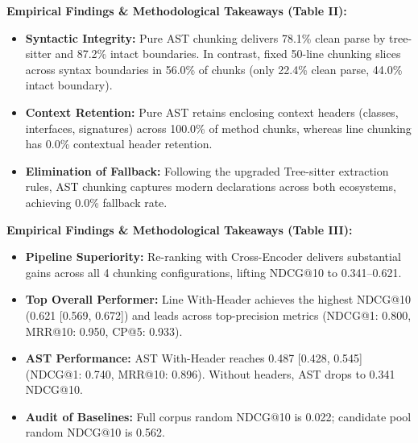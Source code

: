 \documentclass[11pt,a4paper,landscape]{article}
\begin{document}

\FloatBarrier
\vspace{-0.1cm}
{\small
\noindent\textbf{Empirical Findings \& Methodological Takeaways (Table II):}
\begin{itemize}[nosep,topsep=2pt,partopsep=0pt,itemsep=2pt]
    \item \textbf{Syntactic Integrity:} Pure AST chunking delivers 78.1\% clean parse by tree-sitter and 87.2\% intact boundaries. In contrast, fixed 50-line chunking slices across syntax boundaries in 56.0\% of chunks (only 22.4\% clean parse, 44.0\% intact boundary).
    \item \textbf{Context Retention:} Pure AST retains enclosing context headers (classes, interfaces, signatures) across 100.0\% of method chunks, whereas line chunking has 0.0\% contextual header retention.
    \item \textbf{Elimination of Fallback:} Following the upgraded Tree-sitter extraction rules, AST chunking captures modern declarations across both ecosystems, achieving 0.0\% fallback rate.
\end{itemize}
}
\clearpage


\FloatBarrier
\vspace{-0.1cm}
{\footnotesize
\noindent\textbf{Empirical Findings \& Methodological Takeaways (Table III):}
\begin{itemize}[nosep,topsep=2pt,partopsep=0pt,itemsep=2pt]
    \item \textbf{Pipeline Superiority:} Re-ranking with Cross-Encoder delivers substantial gains across all 4 chunking configurations, lifting NDCG@10 to 0.341--0.621.
    \item \textbf{Top Overall Performer:} Line With-Header achieves the highest NDCG@10 (0.621 [0.569, 0.672]) and leads across top-precision metrics (NDCG@1: 0.800, MRR@10: 0.950, CP@5: 0.933).
    \item \textbf{AST Performance:} AST With-Header reaches 0.487 [0.428, 0.545] (NDCG@1: 0.740, MRR@10: 0.896). Without headers, AST drops to 0.341 NDCG@10.
    \item \textbf{Audit of Baselines:} Full corpus random NDCG@10 is 0.022; candidate pool random NDCG@10 is 0.562.
\end{itemize}
}
\clearpage
\end{document}
